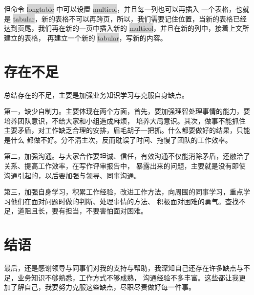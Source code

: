 \documentclass[UTF8,AutoFakeBold]{ctexart}
\begin{document}
但命令 \colorbox{lightgray}{longtable} 中可以设置 \colorbox{lightgray}{multicol}，并且每一列也可以再插入
一个表格，也就是 \colorbox{lightgray}{tabular}，新的表格不可以再跨页，所以，我们需要记住位置，当新的表格已经
达到页尾，我们再在新的一页中插入新的 \colorbox{lightgray}{multicol}，并且在新的列中，接着上文所建立的表格，
再建立一个新的 \colorbox{lightgray}{tabular}，写新的内容。

\section{存在不足}
总结存在的不足，主要是加强业务知识学习与克服自身缺点。
\par 
第一，缺少自制力。主要体现在两个方面，首先，要加强理智处理事情的能力，要培养团队意识，不给大家和小组造成麻烦，
培养大局意识。其次，做事不能抓住主要矛盾，对工作缺乏合理的安排，眉毛胡子一把抓。什么都要做好的结果，只能是什么
都做不好。分不清主次，反而耽误了时间、拖慢了团队的工作效率。
\par 
第二，加强沟通。与大家合作要坦诚、信任，有效沟通不仅能消除矛盾，还融洽了关系、提高工作效率，在写作评审报告中，
暴露出来的问题，主要就是没有即使沟通引起的，以后要加强与领导、同事沟通。
\par
第三，加强自身学习，积累工作经验，改进工作方法，向周围的同事学习，重点学习他们在面对问题时做的判断、处理事情的方法、
积极面对困难的勇气。查找不足，道阻且长，要有担当，不要害怕面对困难。
\section{结语}
最后，还是感谢领导与同事们对我的支持与帮助，我深知自己还存在许多缺点与不足，业务知识不够熟悉，工作方式不够成熟，
沟通经验不多丰富。这些都让我更加了解自己，我要努力克服这些缺点，尽职尽责做好每一件事。
\newpage 
\begin{appendices}
    
    \newpage 
    
\end{appendices}
\end{document}
